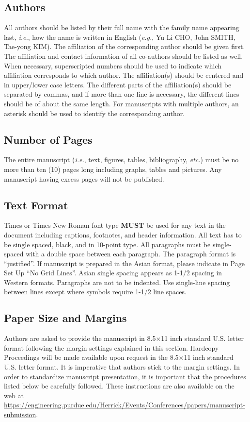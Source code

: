 \documentclass[10pt]{extarticle}
\begin{document}
\subsection{Authors}
All authors should be listed by their full name with the family name appearing last, \textit{i.e.}, how the name is written in English (\textit{e.g.}, Yu Li CHO, John SMITH, Tae-yong KIM). The affiliation of the corresponding author should be given first.  The affiliation and contact information of all co-authors should be listed as well.  When necessary, superscripted numbers should be used to indicate which affiliation corresponds to which author.  The affiliation(s) should be centered and in upper/lower case letters.  The different parts of the affiliation(s) should be separated by commas, and if more than one line is necessary, the different lines should be of about the same length. For manuscripts with multiple authors, an asterisk should be used to identify the corresponding author.  

\subsection{Number of Pages}
The entire manuscript (\textit{i.e.}, text, figures, tables, bibliography, \textit{etc.}) must be no more than ten (10) pages long including graphs, tables and pictures.  Any manuscript having excess pages will not be published. 

\subsection{Text Format}
Times or Times New Roman font type \textbf{MUST} be used for any text in the document including captions, footnotes, and header information.  All text has to be single spaced, black, and in 10-point type. All paragraphs must be single-spaced with a double space between each paragraph. The paragraph format is ``justified''.  If manuscript is prepared in the Asian format, please indicate in Page Set Up ``No Grid Lines''.  Asian single spacing appears as 1-1/2 spacing in Western formats.  Paragraphs are not to be indented. Use single-line spacing between lines except where symbols require 1-1/2 line spaces. 

\subsection{Paper Size and Margins}
Authors are asked to provide the manuscript in 8.5$\times$11 inch standard U.S. letter format following the margin settings explained in this section.  Hardcopy Proceedings will be made available upon request in the 8.5$\times$11 inch standard U.S. letter format.  It is imperative that authors stick to the margin settings.  In order to standardize manuscript presentation, it is important that the procedures listed below be carefully followed. These instructions are also available on the web at \url{https://engineering.purdue.edu/Herrick/Events/Conferences/papers/manuscript-submission}. 
\end{document}
